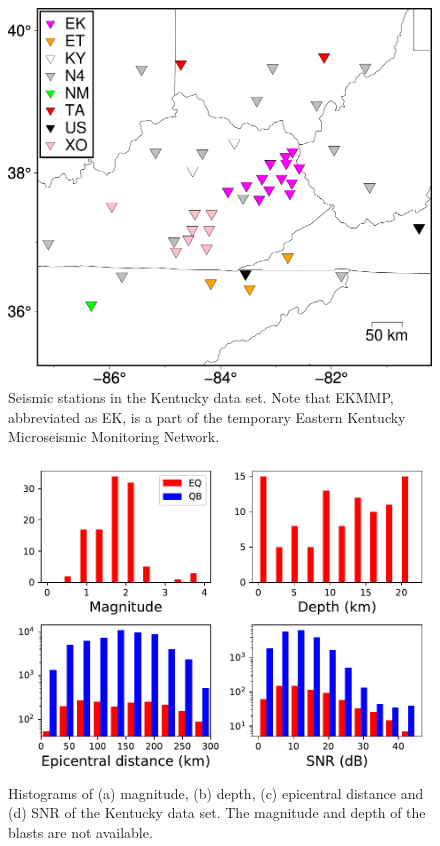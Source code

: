 \documentclass[12pt]{article}
\begin{document}
\begin{figure}
	\centering
	\includegraphics[width=.8\textwidth]{station_ek.pdf}
	\caption{Seismic stations in the Kentucky data set. Note that EKMMP,
abbreviated as EK, is a part of the temporary Eastern Kentucky Microseismic Monitoring Network.}
        \label{station_ek}
\end{figure}

\begin{figure}
        \centering
	\includegraphics[width=.9\textwidth]{hist_ek_side_bar.pdf}
	\caption{Histograms of (a) magnitude, (b) depth, (c) epicentral distance and (d) SNR of the Kentucky data set. The magnitude and depth of the blasts are not available.}
\end{figure}
\end{document}
